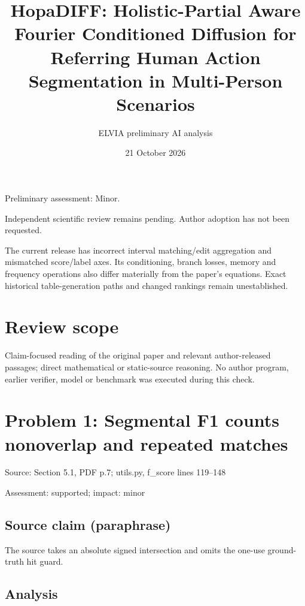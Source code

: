 \documentclass[11pt]{article}
\begin{document}
\title{HopaDIFF: Holistic-Partial Aware Fourier Conditioned Diffusion for Referring Human Action Segmentation in Multi-Person Scenarios}

\author{ELVIA preliminary AI analysis}\date{21 October 2026}\maketitle

Preliminary assessment: Minor.\par

Independent scientific review remains pending. Author adoption has not been requested.

The current release has incorrect interval matching/edit aggregation and mismatched score/label axes. Its conditioning, branch losses, memory and frequency operations also differ materially from the paper’s equations. Exact historical table-generation paths and changed rankings remain unestablished.

\section*{Review scope}

Claim-focused reading of the original paper and relevant author-released passages; direct mathematical or static-source reasoning. No author program, earlier verifier, model or benchmark was executed during this check.

\section*{Problem 1: Segmental F1 counts nonoverlap and repeated matches}

Source: Section 5.1, PDF p.7; utils.py, f\_score lines 119–148

Assessment: supported; impact: minor

\subsection*{Source claim (paraphrase)}

The source takes an absolute signed intersection and omits the one-use ground-truth hit guard.

\subsection*{Analysis}
\end{document}
